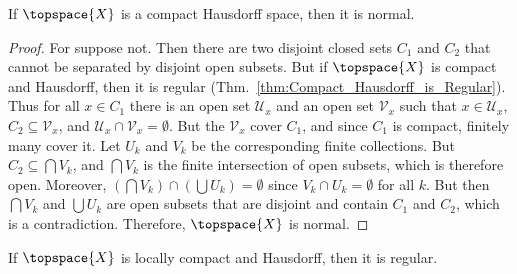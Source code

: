         \begin{theorem}
            \label{thm:Compact_Hausdorff_is_Normal}%
            If $\topspace{X}$ is a compact Hausdorff space, then it is
            normal.
        \end{theorem}
        \begin{proof}
            For suppose not. Then there are two disjoint closed sets $C_{1}$
            and $C_{2}$ that cannot be separated by disjoint open subsets.
            But if $\topspace{X}$ is compact and Hausdorff, then it is
            regular (Thm.~\ref{thm:Compact_Hausdorff_is_Regular}). Thus for
            all $x\in{C}_{1}$ there is an open set $\mathcal{U}_{x}$ and an
            open set $\mathcal{V}_{x}$ such that $x\in\mathcal{U}_{x}$,
            $C_{2}\subseteq\mathcal{V}_{x}$, and
            $\mathcal{U}_{x}\cap\mathcal{V}_{x}=\emptyset$. But the
            $\mathcal{V}_{x}$ cover $C_{1}$, and since $C_{1}$ is compact,
            finitely many cover it. Let $U_{k}$ and $V_{k}$ be the
            corresponding finite collections. But
            $C_{2}\subseteq\bigcap{V}_{k}$, and $\bigcap{V}_{k}$ is the
            finite intersection of open subsets, which is therefore open.
            Moreover, $(\bigcap{V}_{k})\cap(\bigcup{U}_{k})=\emptyset$
            since $V_{k}\cap{U}_{k}=\emptyset$ for all $k$. But then
            $\bigcap{V}_{k}$ and $\bigcup{U}_{k}$ are open subsets that
            are disjoint and contain $C_{1}$ and $C_{2}$, which is a
            contradiction. Therefore, $\topspace{X}$ is normal.
        \end{proof}
        \begin{theorem}
            \label{thm:Loc_Comp_and_Hausdorff_is_Regular}%
            If $\topspace{X}$ is locally compact and Hausdorff, then it is
            regular.
        \end{theorem}
